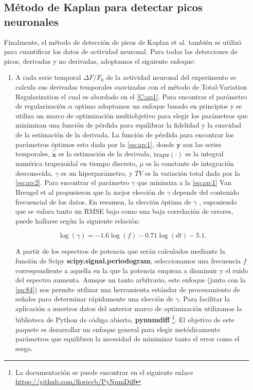 \subsection{Método de Kaplan para detectar picos neuronales}\label{sec:metodos_picos}

Finalmente,  el método de  detección de picos de Kaplan et al. \cite{kaplan_nested_2020}  también se utilizó para cuantificar los datos de actividad neuronal. Para todas las detecciones de picos, derivadas y no derivadas, adoptamos el siguiente enfoque:



\begin{enumerate}
	
	\item  A cada serie temporal $\Delta F/F_0$ de la actividad neuronal del experimento   se calcula sus derivadas temporales suavizadas con el método de Total-Variation Regularization  el cual es abordado en el \cref{C:ap1}. Para encontrar el parámetro de regularización  $\alpha$ optimo adoptamos un enfoque basado en principios y se utiliza un marco de optimización multiobjetivo para elegir los parámetros que minimizan una función de pérdida para equilibrar la fidelidad y la suavidad de la estimación de la derivada.  La función de pérdida para encontrar los parámetros óptimos esta dada por la \cref{eq:ap:1}, donde $\mathbf{y}$  son las series temporales, $\mathbf{\hat{\dot{x}}}$ es la estimación de la derivada,  $\text{trapz}(\cdot)$ es la integral numérica trapezoidal en tiempo discreto,  $\mu$	es la constante de integración desconocida,  $\gamma$ es un hiperparámetro, y  $TV$  es la variación total dada por la \cref{eq:ap:2}.  Para encontrar el parámetro $\gamma$ que minimiza a la \cref{eq:ap:1}   Van Breugel et al \cite{van_breugel_numerical_2020} propusieron que la mejor elección de $\gamma$ depende del contenido frecuencial de los datos. En resumen, la elección óptima de $\gamma$ , suponiendo que se valora tanto un RMSE bajo como una baja correlación de errores, puede hallarse según la siguiente relación: 
	
	
	\begin{equation}\label{eq:84}
		\log (\gamma) = -1.6\log (f) -0.71\log (dt) -5.1.
	\end{equation}
	
	A partir de los espectros de potencia que serán calculados mediante la función  de Scipy \textbf{scipy.signal.periodogram}, seleccionamos una frecuencia $f$ correspondiente a aquella en la que la potencia empieza a disminuir y el ruido del espectro aumenta. Aunque un tanto arbitrario, este enfoque (junto con la \cref{eq:84}) nos permite utilizar una herramienta estándar de procesamiento de señales para determinar rápidamente una elección de $\gamma$. Para facilitar la aplicación a nuestros datos del anterior marco de optimización utilizamos la biblioteca de Python de código abierto, \textbf{pynumdiff} \footnote{La documentación se puede encontrar en  el siguiente enlace \url{https://github.com/florisvb/PyNumDiff}}.  El  objetivo de este paquete es desarrollar un enfoque general para elegir metódicamente parámetros que equilibren la necesidad de minimizar tanto el error como el sesgo. 
	

\end{enumerate}
